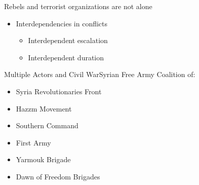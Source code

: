 \documentclass{beamer}
\begin{document}
\begin{frame}{Rebels and terrorist organizations are not alone}
\begin{itemize}
\item Interdependencies in conflicts
\begin{itemize}
\item Interdependent escalation
\item Interdependent duration
\end{itemize}
\end{itemize}
\end{frame}




\begin{frame}{Multiple Actors and Civil War}{Syrian Free Army}
Coalition of:
\begin{itemize}
\item Syria Revolutionaries Front
\item Hazzm Movement
\item Southern Command 
\item First Army
\item Yarmouk Brigade
\item Dawn of Freedom Brigades
\end{itemize}
\end{frame}


\end{document}
